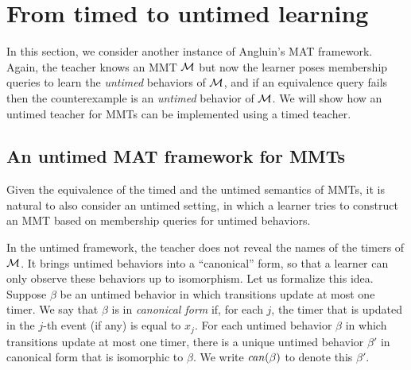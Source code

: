 \newcommand{\Constraints}[1]{\mathsf{constraints}({#1})}
\newcommand{\Frac}[1]{\mathsf{frac}({#1})}
\newcommand{\Addtimer}[4]{\mathsf{addtimer}({#1,#2,#3,#4})}

\section{From timed to untimed learning}  
\label{algorithm}
In this section, we consider another instance of Angluin's MAT framework.
Again, the teacher knows an MMT ${\mathcal M}$ but now the learner poses membership queries
to learn the \emph{untimed} behaviors of ${\mathcal M}$, and if an equivalence query fails then the counterexample is an \emph{untimed} behavior of ${\mathcal M}$.
We will show how an untimed teacher for MMTs can be implemented using a timed teacher.

\subsection{An untimed MAT framework for MMTs}
\label{sec:untimed-mat}
Given the equivalence of the timed and the untimed semantics of MMTs, it is natural to also 
consider an untimed setting, in which a learner tries to construct an MMT based on membership queries for untimed behaviors.

In the untimed framework, the teacher does not reveal the names of the timers of ${\mathcal M}$. 
It brings untimed behaviors into a ``canonical'' form, so that a learner can only observe these behaviors up to isomorphism.
Let us formalize this idea.
Suppose $\beta$ be an untimed behavior in which transitions update at most one timer.
We say that $\beta$ is in \emph{canonical form} if, for each $j$, the timer that is updated in the $j$-th event
(if any) is equal to $x_j$.
For each untimed behavior $\beta$ in which transitions update at most one timer, there is a unique untimed behavior
$\beta'$ in canonical form that is isomorphic to $\beta$.
We write $\mathit{can}({\beta})$ to denote this $\beta'$.

